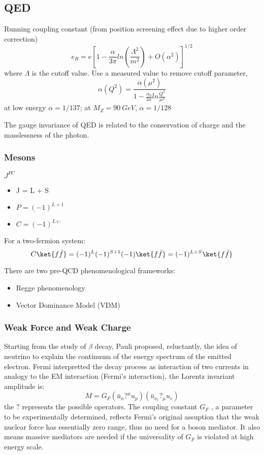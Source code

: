 \subsection{QED}
Running coupling constant (from position screening effect due to higher order 
correction)
\begin{equation}
    e_R = e\left[ 1 - \frac{\alpha}{3\pi}ln\left( \frac{\Lambda^2}{m^2}\right) + O(\alpha^2) \right]^{1/2}
\end{equation}
where $\Lambda$ is the cutoff value. Use a measured value to remove cutoff parameter,
\begin{equation}
    \alpha(Q^2) = \frac{\alpha(\mu^2)}{1-\frac{\alpha_0}{3\pi}ln\frac{Q^2}{\mu^2}}
\end{equation}
at low energy $\alpha = 1/137$;
at $M_Z = 90\ GeV$, $\alpha = 1/128$

The gauge invariance of QED is related to the conservation of charge and the
masslessness of the photon.
\subsubsection{Mesons}
$J^{PC}$
\begin{itemize}
    \item J = L + S
    \item $P = (-1)^{L+1}$
    \item $C = (-1)^{L+:}$
\end{itemize}
For a two-fermion system:
$$ C\ket{f\bar{f}} = (-1)^L (-1)^{S+1}(-1) \ket{f\bar{f}} = (-1)^{L+S}\ket{f\bar{f}} $$

There are two pre-QCD phenomenological frameworks:
\begin{itemize}
    \item Regge phenomenology \cite{PhysRev.108.1063}
    \item Vector Dominance Model (VDM)
\end{itemize}
\subsubsection{Weak Force and Weak Charge}
Starting from the study of $\beta$ decay, Pauli proposed, reluctantly, the idea
of neutrino to explain the continuum of the energy spectrum of the emitted electron.
Fermi interpretted the decay process as interaction of two currents in analogy to
the EM interaction (Fermi's interaction), the Lorentz invariant amplitude is:
$$ M = G_F (\bar{u}_n ?^\mu u_p) (\bar{u}_{\nu_e}  ?_\mu u_e)$$
the $?$ represents the possible operators. The coupling constant $G_F$ , a parameter
to be experimentally determined, reflects Fermi's original assuption that the 
weak nuclear force has essentially zero range, thus no need for a boson mediator.
It also means massive mediators are needed if the universality of $G_F$ is violated
at high energy scale.

